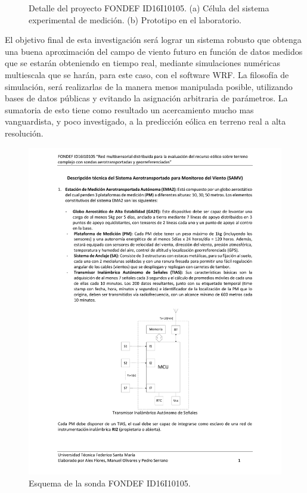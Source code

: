 \begin{figure}
\begin{minipage}{0.5\linewidth}
	\end{minipage}
	\caption{Detalle del proyecto FONDEF ID16I10105. (a) Célula del sistema experimental de medición. (b) Prototipo en el laboratorio.}
	\label{fig:01_detalle_fondef}
\end{figure}


El objetivo final de esta investigación será lograr un sistema robusto que obtenga una buena aproximación del campo de viento futuro en función de datos medidos que se estarán obteniendo en tiempo real, mediante simulaciones numéricas multiescala que se harán, para este caso, con el software WRF. La filosofía de simulación, será realizarlas de la manera menos manipulada posible, utilizando bases de datos públicas y evitando la asignación arbitraria de parámetros. La sumatoria de esto tiene como resultado un acercamiento mucho mas vanguardista, y poco investigado, a la predicción eólica en terreno real a alta resolución. 

\begin{figure}[h!]
	\centering
	\includegraphics[width=0.90\linewidth,page=5,trim={3cm 2cm 2.3cm 3cm},clip]{Imagenes/01/descrp}
	\caption{Esquema de la sonda FONDEF ID16I10105.}
	\label{fig:01_sonda}
\end{figure}


